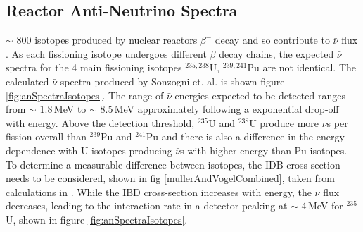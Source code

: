 \subsection{Reactor Anti-Neutrino Spectra}
$\sim$ 800 isotopes produced by nuclear reactors $\beta^-$ decay and so contribute to $\bar{\nu}$ flux \cite{sonzogni_nucStrcutre_2015}. As each fissioning isotope undergoes different $\beta$ decay chains, the expected $\bar{\nu}$ spectra for the 4 main fissioning isotopes $^{235,238}$U, $^{239,241}$Pu are not identical. The calculated $\bar{\nu}$ spectra produced by Sonzogni et. al. \cite{sonzogni_nucStrcutre_2015} is shown figure \ref{fig:anSpectraIsotopes}. The range of $\bar{\nu}$ energies expected to be detected ranges from $\sim$ 1.8\,MeV to $\sim$ 8.5\,MeV approximately following a exponential drop-off with energy. Above the detection threshold, $^{235}$U and $^{238}$U produce more $\bar{\nu}$s per fission overall than $^{239}$Pu and $^{241}$Pu and there is also a difference in the energy dependence with U isotopes producing $\bar{\nu}$s with higher energy than Pu isotopes. To determine a measurable difference between isotopes, the IDB cross-section needs to be considered, shown in fig \ref{mullerAndVogelCombined}, taken from calculations in \cite{Vogel_1999}. While the IBD cross-section increases with energy, the $\bar{\nu}$ flux decreases, leading to the interaction rate in a detector peaking at $\sim$ 4\,MeV for $^{235}$U, shown in figure \ref{fig:anSpectraIsotopes}.

